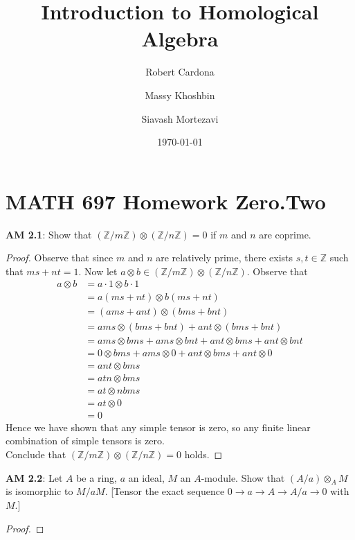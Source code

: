 \documentclass[8pt]{amsart}
\theoremstyle{plain}%
\theoremstyle{definition}
\theoremstyle{remark}
\numberwithin{equation}{section}
\newcommand{\Z}{\mathbb{Z}}
\begin{document}
\title[MATH 697]{Introduction to Homological Algebra}


\author{
	Robert Cardona %
	\and
	Massy Khoshbin %
	\and
	Siavash Mortezavi %
}


\address{Department of Mathematics \\ California State University Long Beach}

\date{\today}


\maketitle

\setcounter{section}{-1}
\section{MATH 697 Homework Zero.Two}


\textbf{ AM 2.1}: Show that $(\Z/m\Z) \otimes (\Z/n\Z) = 0$ if $m$ and $n$ are coprime.
	\begin{proof}
		Observe that since $m$ and $n$ are relatively prime, there exists $s, t \in \Z$ such that $ms + nt = 1$. Now let $a \otimes b \in (\Z/m\Z) \otimes (\Z/n\Z)$. Observe that
		\begin{align*}
			a \otimes b &= a \cdot 1 \otimes b \cdot 1\\
			&= a (ms + nt) \otimes b (ms + nt)\\
			&= (ams + ant) \otimes (bms + bnt)\\
			&= ams \otimes (bms + bnt) + ant \otimes (bms + bnt)\\
			&= ams \otimes bms + ams \otimes bnt + ant \otimes bms + ant \otimes bnt\\
			&= 0 \otimes bms + ams \otimes 0 + ant \otimes bms + ant \otimes 0\\
			&= ant \otimes bms\\
			&= atn \otimes bms\\
			&= at \otimes nbms\\
			&= at \otimes 0\\
			&= 0
		\end{align*}
		Hence we have shown that any simple tensor is zero, so any finite linear combination of simple tensors is zero.\\

		Conclude that  $(\Z/m\Z) \otimes (\Z/n\Z) = 0$ holds.
	\end{proof}

\textbf{ AM 2.2}: Let $A$ be a ring, $a$ an ideal, $M$ an $A$-module. Show that $(A/a) \otimes_AM$ is isomorphic to $M/aM$. [Tensor the exact sequence $0 \longrightarrow a \longrightarrow A \longrightarrow A/a \longrightarrow 0$ with $M$.]
	\begin{proof}
	
	\end{proof}
\end{document}
